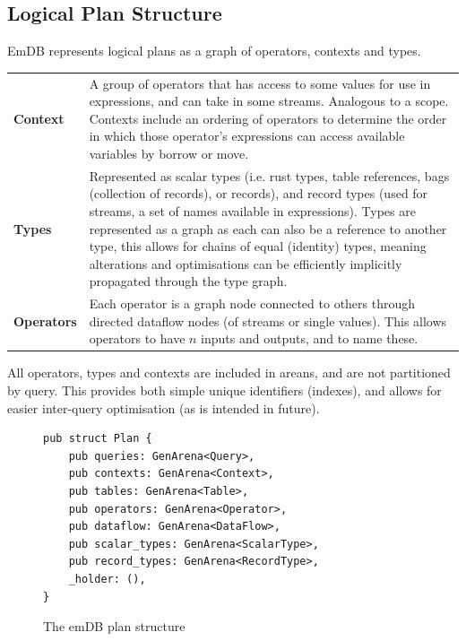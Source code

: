 \subsection{Logical Plan Structure}
EmDB represents logical plans as a graph of operators, contexts and types.
\begin{center}
    \begin{tabular}{l p{}}
        \textbf{Context}   & A group of operators that has access to some values for use in expressions,
        and can take in some streams. Analogous to a scope. Contexts include an ordering of operators
        to determine the order in which those operator's expressions can access available variables by
        borrow or move.                                                                                  \\
        \textbf{Types}     & Represented as scalar types (i.e. rust types, table references, bags
        (collection of records), or records), and record types (used for streams, a set of names
        available in expressions). Types are represented as a graph as each can also be a reference
        to another type, this allows for chains of equal (identity) types, meaning alterations and
        optimisations can be efficiently implicitly propagated through the type graph.                   \\
        \textbf{Operators} & Each operator is a graph node connected to others through directed
        dataflow nodes (of streams or single values). This allows operators to have $n$ inputs and
        outputs, and to name these.                                                                      \\
    \end{tabular}
\end{center}
All operators, types and contexts are included in areans, and are not partitioned by query. This provides
both simple unique identifiers (indexes), and allows for easier inter-query optimisation (as is intended
in future).
\begin{figure}[h!]
    \begin{verbatim}
pub struct Plan {
    pub queries: GenArena<Query>,
    pub contexts: GenArena<Context>,
    pub tables: GenArena<Table>,
    pub operators: GenArena<Operator>,
    pub dataflow: GenArena<DataFlow>,
    pub scalar_types: GenArena<ScalarType>,
    pub record_types: GenArena<RecordType>,
    _holder: (),
}
    \end{verbatim}
    \caption{The emDB plan structure}
\end{figure}

